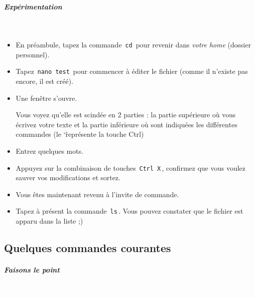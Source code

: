 \documentclass[11pt,a4paper]{article}
\begin{document}
            \par
        
			
		\subparagraph{Exp\'erimentation} 
		
					\textcolor{white}{.} \par
				
            \par
        
					\begin{itemize}
				
			\item 
						En pr\'eambule, tapez la commande \,\verb|cd|\,
						pour revenir dans \textit{votre home}
						(dossier personnel).
					
			\item 
						Tapez \,\verb|nano test|\,
						pour commencer \`a \'editer le fichier \verb@test@
						(comme il n'existe pas encore, il est cr\'e\'e).
					
			\item 
						Une fen\^etre s'ouvre. 
						            
						Vous voyez qu'elle est scind\'ee en 2 parties : 
						la partie sup\'erieure o\`u vous \'ecrivez votre texte 
						et la partie inf\'erieure o\`u sont indiqu\'ees les diff\'erentes commandes
						(le \char`\^ repr\'esente la touche Ctrl)
            
			\item 
						Entrez quelques mots.
            
			\item 
						Appuyez sur la combinaison de touches \,\verb|Ctrl X|\,, 
						confirmez que vous voulez sauver vos modifications et sortez.
            
			\item 
					  Vous \^etes maintenant revenu \`a l'invite de commande.
					
			\item 
						Tapez \`a pr\'esent la commande \,\verb|ls|\,.
						Vous pouvez constater que le fichier \verb@test@
						est apparu dans la liste ;)
					
					\end{itemize}
				\subsection{Quelques commandes courantes}
			
		\subparagraph{Faisons le point} 
		
                \textcolor{white}{.} \par
            
\end{document}
